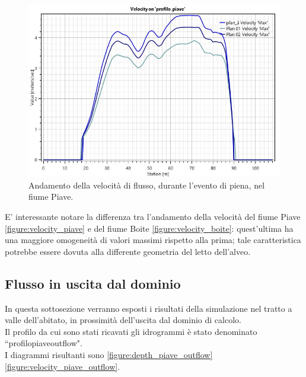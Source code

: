 \begin{figure}[htb] \centering
    \includegraphics[scale=0.5]{immagini/velocity_piave.JPG}
    \caption{Andamento della velocità di flusso, durante l'evento di piena, nel fiume Piave.}
    \label{figure:velocity_piave}
\end{figure}

E' interessante notare la differenza tra l'andamento della velocità del fiume Piave \eqref{figure:velocity_piave} e del fiume Boite \eqref{figure:velocity_boite}: quest'ultima ha una maggiore omogeneità di valori massimi rispetto alla prima; tale caratteristica potrebbe essere dovuta alla differente geometria del letto dell'alveo.

\subsection{Flusso in uscita dal dominio}
In questa sottosezione verranno esposti i risultati della simulazione nel tratto a valle dell'abitato, in prossimità dell'uscita dal dominio di calcolo.\\
Il profilo da cui sono stati ricavati gli idrogrammi è stato denominato  ``profilo\textunderscore piave\textunderscore outflow".\\
I diagrammi risultanti sono \eqref{figure:depth_piave_outflow}\eqref{figure:velocity_piave_outflow}.

